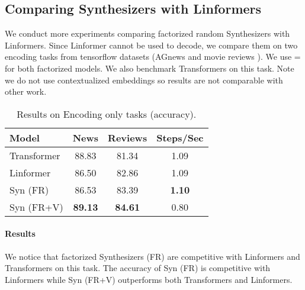 \documentclass{article} \usepackage{iclr2021_conference,times}
\begin{document}
\subsection{Comparing Synthesizers with Linformers}
We conduct more experiments comparing factorized random Synthesizers with Linformers. Since Linformer cannot be used to decode, we compare them on two encoding tasks from tensorflow datasets (AGnews \citep{zhang2015character} and movie reviews \citep{maas-EtAl:2011:ACL-HLT2011}). We use = for both factorized models. We also benchmark Transformers on this task. Note we do not use contextualized embeddings so results are not comparable with other work. 
\begin{minipage}{0.5\linewidth}
\begin{table}[H]
    \centering
    \small
    \begin{tabular}{l|ccc}
    \hline
      Model   &  News & Reviews & Steps/Sec   \\
      \hline
     Transformer    & 88.83 & 81.34 & 1.09 \\
     Linformer  & 86.50&  82.86 & 1.09\\ 
     \hline
Syn (FR) & 86.53 & 83.39 & \textbf{1.10}\\
     Syn (FR+V) & \textbf{89.13} & \textbf{84.61} & 0.80\\ 
         \hline
    \end{tabular}
    \caption{Results on Encoding only tasks (accuracy).}
    \label{tab:my_label}
\end{table}
\end{minipage}
\begin{minipage}{0.48\linewidth}
\paragraph{Results} We notice that factorized Synthesizers (FR) are competitive with Linformers and Transformers on this task. The accuracy of Syn (FR) is competitive with Linformers while Syn (FR+V) outperforms both Transformers and Linformers.
\end{minipage}
\end{document}
